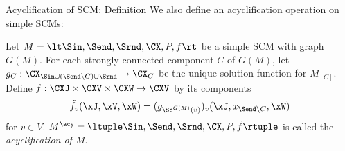 \begin{frame}{Acyclification of SCM: Definition}
  We also define an acyclification operation on simple SCMs:
  \begin{Def}[\ref{def:scm_acyclification}]
    Let $M = \lt \Sin, \Send, \Srnd, \CX, P, f \rt$ be a simple SCM with graph $G(M)$.
    For each strongly connected component $C$ of $G(M)$, let 
    $g_C : \CX_{\Sin \cup (\Send \setminus C) \cup \Srnd} \to \CX_C$
    be the unique solution function for $M_{[C]}$.
    Define $\tilde{f} : \CXJ \times \CXV \times \CXW \to \CXV$ by its components
    $$\tilde{f}_v(\xJ,\xV,\xW) = (g_{\Sc^{G(M)}(v)})_v(\xJ,x_{\Send\setminus C},\xW)$$
    for $v \in V$.
    $M^\acy = \ltuple \Sin, \Send, \Srnd, \CX, P, \tilde{f} \rtuple$ is called the
    \emph{acyclification of $M$}.
  \end{Def}
\end{frame}


